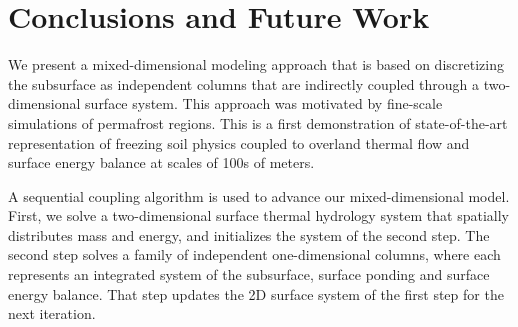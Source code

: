 \documentclass[review]{elsarticle}
\begin{document}
\section{Conclusions and Future Work}\label{conclusion}

We present a mixed-dimensional modeling approach that is based on discretizing  the subsurface as independent columns that are indirectly coupled through a two-dimensional surface system. This approach was motivated by fine-scale simulations of permafrost regions. This is a first demonstration of state-of-the-art representation of freezing soil physics coupled to overland thermal flow and surface energy balance at scales of 100s of meters.

  



A sequential coupling algorithm is used to advance our mixed-dimensional model. First, we solve a two-dimensional surface thermal hydrology system that spatially distributes mass and energy, and initializes the system of the second step. The second step solves a family of independent one-dimensional columns, where each represents an integrated system of the subsurface, surface ponding and surface energy balance. That step updates the 2D surface system of the first step for the next iteration.
\end{document}
